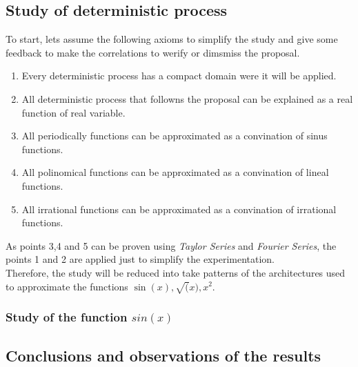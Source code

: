 \documentclass[a4paper, 11pt]{article}
\begin{document}
\newpage
\subsection{Study of deterministic process}
To start, lets assume the following axioms to simplify the study and give some feedback to make the correlations to werify or dimsmiss the proposal.
\begin{enumerate}
    \item Every deterministic process has a compact domain were it will be applied.
    \item All deterministic process that followns the proposal can be explained as a real function of real variable.
    \item All periodically functions can be approximated as a convination of sinus functions.
    \item All polinomical functions can be approximated as a convination of lineal functions.
    \item All irrational functions can be approximated as a convination of irrational functions.
\end{enumerate}
As points 3,4 and 5 can be proven using \textit{Taylor Series} and \textit{Fourier Series}, the points 1 and 2 are applied just to simplify the experimentation.\\
Therefore, the study will be reduced into take patterns of the architectures used to approximate the functions $\sin(x), \sqrt(x), x^2$.

\subsubsection{Study of the function $sin(x)$}

\newpage
\subsection{Conclusions and observations of the results}
\end{document}
